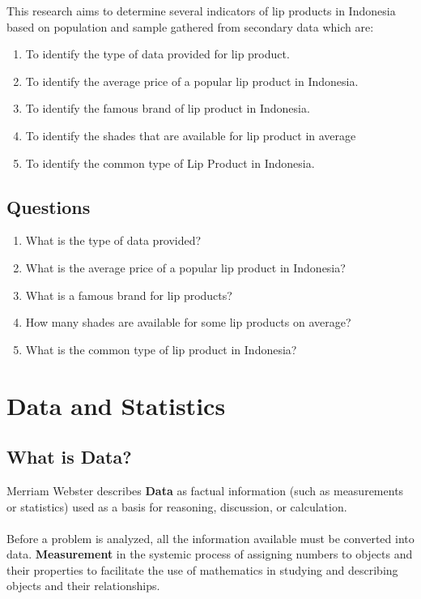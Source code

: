 \documentclass{article}
\begin{document}
        This research aims to determine several indicators of lip products in Indonesia based on population and sample gathered from    secondary data which are:
        \bigskip
    
        \begin{enumerate}
            \item To identify the type of data provided for lip product.
            \item To identify the average price of a popular lip product in Indonesia.
            \item To identify the famous brand of lip product in Indonesia.
            \item To identify the shades that are available for lip product in average
            \item To identify the common type of Lip Product in Indonesia.
        \end{enumerate}
    
        \subsection{Questions}
    
        \begin{enumerate}
            \item What is the type of data provided?
            \item What is the average price of a popular lip product in Indonesia?
            \item What is a famous brand for lip products?
            \item How many shades are available for some lip products on average?
            \item What is the common type of lip product in Indonesia?
        \end{enumerate}

    \section{Data and Statistics}

        \subsection{What is Data?}
        Merriam Webster describes \textbf{Data} as factual information (such as measurements or statistics) used as a basis for reasoning,  discussion, or calculation.  
        \\ \\
        Before a problem is analyzed, all the information available must be converted into data. \textbf{Measurement} in the systemic process of assigning numbers to objects and their properties to facilitate the use of mathematics in studying and describing  objects and their relationships.
    
\end{document}
